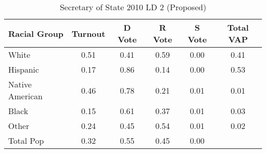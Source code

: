 \begin{table}[htb]
\begin{center}
\caption{Secretary of State 2010 LD 2 (Proposed)}
\label{sos10_vap_ld_2}
\begin{tabular}{lccccc}
  \hline
Racial Group & Turnout & D Vote & R Vote & S Vote & Total VAP \\ 
  \hline
White & 0.51 & 0.41 & 0.59 & 0.00 & 0.41 \\ 
  Hispanic & 0.17 & 0.86 & 0.14 & 0.00 & 0.53 \\ 
  Native American & 0.46 & 0.78 & 0.21 & 0.01 & 0.01 \\ 
  Black & 0.15 & 0.61 & 0.37 & 0.01 & 0.03 \\ 
  Other & 0.24 & 0.45 & 0.54 & 0.01 & 0.02 \\ 
  Total Pop & 0.32 & 0.55 & 0.45 & 0.00 &  \\ 
   \hline
\end{tabular}
\end{center}
\end{table}
